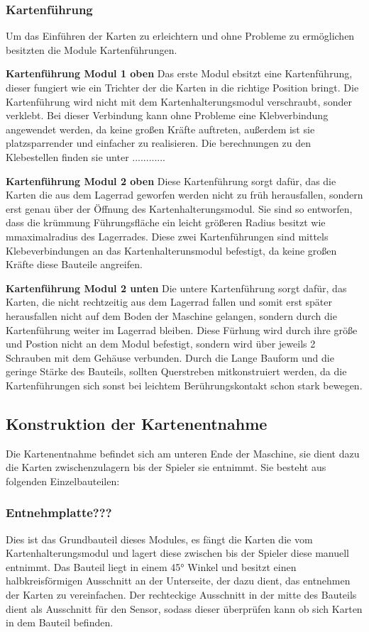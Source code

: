 \subsubsection{Kartenführung}
Um das Einführen der Karten zu erleichtern und ohne Probleme zu ermöglichen besitzten die Module Kartenführungen.

\textbf{Kartenführung Modul 1 oben}
Das erste Modul ebsitzt eine Kartenführung, dieser fungiert wie ein Trichter der die Karten in die richtige Position bringt.
Die Kartenführung wird nicht mit dem Kartenhalterungsmodul verschraubt, sonder
verklebt. Bei dieser Verbindung kann ohne Probleme eine Klebverbindung angewendet werden, da keine großen Kräfte auftreten, außerdem
ist sie platzsparrender und einfacher zu realisieren. Die berechnungen zu den Klebestellen finden sie unter ............

\textbf{Kartenführung Modul 2 oben}
Diese Kartenführung sorgt dafür, das die Karten die aus dem Lagerrad geworfen werden nicht zu früh herausfallen,
sondern erst genau über der Öffnung des Kartenhalterungsmodul. Sie sind so entworfen, dass die krümmung Führungsfläche ein leicht
größeren Radius besitzt wie mmaximalradius des Lagerrades. Diese zwei Kartenführungen sind mittels Klebeverbindungen
an das Kartenhalterunsmodul befestigt, da keine großen Kräfte diese Bauteile angreifen.

\textbf{Kartenführung Modul 2 unten}
Die untere Kartenführung sorgt dafür, das Karten, die nicht rechtzeitig aus dem Lagerrad fallen und somit erst später
herausfallen nicht auf dem Boden der Maschine gelangen, sondern durch die Kartenführung weiter im Lagerrad bleiben. Diese Fürhung
wird durch ihre größe und Postion nicht an dem Modul befestigt, sondern wird über jeweils 2 Schrauben mit dem Gehäuse
verbunden. Durch die Lange Bauform und die geringe Stärke des Bauteils, sollten Querstreben mitkonstruiert werden,
da die Kartenführungen sich sonst bei leichtem Berührungskontakt schon stark bewegen.

\subsection{Konstruktion der Kartenentnahme}
Die Kartenentnahme befindet sich am unteren Ende der Maschine, sie dient dazu die Karten zwischenzulagern bis der Spieler
sie entnimmt. Sie besteht aus folgenden Einzelbauteilen:

\subsubsection{Entnehmplatte???}
Dies ist das Grundbauteil dieses Modules, es fängt  die Karten die vom Kartenhalterungsmodul und lagert diese zwischen bis
der Spieler diese manuell entnimmt. Das Bauteil liegt in einem 45° Winkel und besitzt einen halbkreisförmigen Ausschnitt
an der Unterseite, der dazu dient, das entnehmen der Karten zu vereinfachen. Der rechteckige Ausschnitt in der mitte des
Bauteils dient als Ausschnitt für den Sensor, sodass dieser überprüfen kann ob sich Karten in dem Bauteil befinden.

